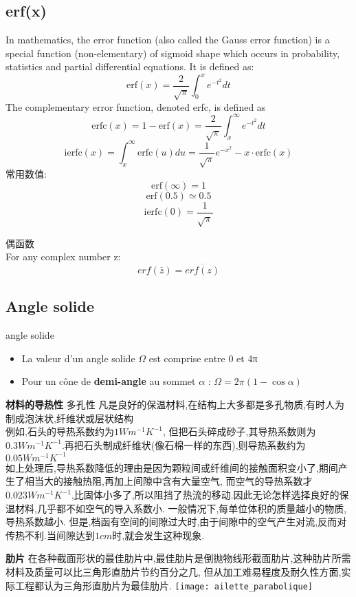 \documentclass[openany]{book}
\begin{document}
\subsection{erf(x)}
In mathematics, the error function (also called the Gauss error function) is a special function (non-elementary) of sigmoid shape which occurs in probability, statistics and partial differential equations. It is defined as:
\begin{equation}
 \mbox{erf}(x)=\frac{2}{\sqrt{\pi}}\int_{0}^{x}e^{-t^2}dt
\end{equation}
The complementary error function, denoted erfc, is defined as
\begin{equation}
 \mbox{erfc}(x)=1-\mbox{erf}(x)=\frac{2}{\sqrt{\pi}}\int_{x}^{\infty }e^{-t^2}dt
\end{equation}
$$\mbox{ierfc}(x)=\int_x^{\infty}\mbox{erfc}(u)du=\frac{ 1}{\sqrt{\pi}}e^{-x^2} -  x \cdot \mbox{erfc}(x)$$
常用数值:
$$\mbox{erf}(\infty)=1$$
$$\mbox{erf}(0.5) \simeq 0.5$$
$$\mbox{ierfc}(0)=\frac{ 1}{\sqrt{\pi}}$$

偶函数\\
For any complex number z:
\begin{equation}
 erf(\overline{z})=\overline{erf(z)}
\end{equation}

\subsection{Angle solide}
angle solide
\begin{itemize}
\item La valeur d’un angle solide $\Omega$ est comprise entre 0 et 4π
\item Pour un c\^one de \textbf{demi-angle} au sommet $\alpha$ : $\Omega = 2\pi(1- \cos \alpha)$
\end{itemize}

\textbf{材料的导热性}
多孔性 凡是良好的保温材料,在结构上大多都是多孔物质,有时人为制成泡沫状,纤维状或层状结构 \\
例如,石头的导热系数约为$1Wm^{-1}K^{-1}$, 但把石头碎成砂子,其导热系数则为$0.3Wm^{-1}K^{-1}$.再把石头制成纤维状(像石棉一样的东西),则导热系数约为$0.05Wm^{-1}K^{-1}$ \\
如上处理后,导热系数降低的理由是因为颗粒间或纤维间的接触面积变小了,期间产生了相当大的接触热阻,再加上间隙中含有大量空气,
而空气的导热系数才$0.023Wm^{-1}K^{-1}$,比固体小多了,所以阻挡了热流的移动.因此无论怎样选择良好的保温材料,几乎都不如空气的导入系数小.
一般情况下,每单位体积的质量越小的物质,导热系数越小. 但是,档函有空间的间隙过大时,由于间隙中的空气产生对流,反而对传热不利.当间隙达到$1cm$时,就会发生这种现象.

\textbf{肋片}
在各种截面形状的最佳肋片中,最佳肋片是倒抛物线形截面肋片,这种肋片所需材料及质量可以比三角形直肋片节约百分之几,
但从加工难易程度及耐久性方面,实际工程都认为三角形直肋片为最佳肋片.
\texttt{[image: ailette\_parabolique]}\\
\end{document}

